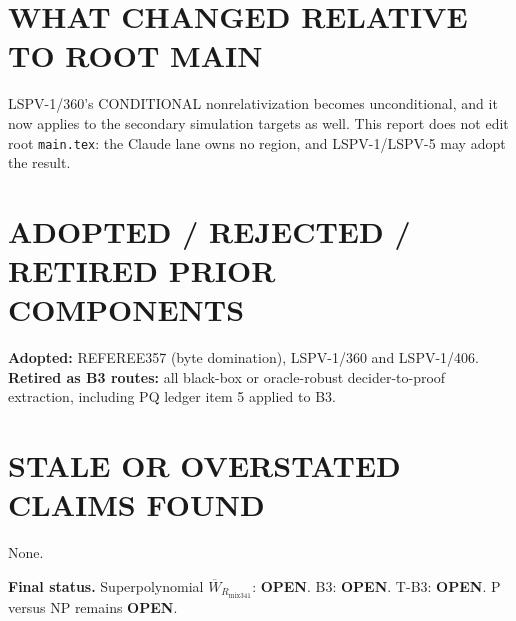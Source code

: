 \documentclass[11pt]{article}
\newcommand{\W}{\overline W}
\begin{document}
\section*{WHAT CHANGED RELATIVE TO ROOT MAIN}
LSPV-1/360's CONDITIONAL nonrelativization becomes unconditional, and it now applies to the secondary simulation targets as well.
This report does not edit root \texttt{main.tex}: the Claude lane owns no region, and LSPV-1/LSPV-5 may adopt the result.

\section*{ADOPTED / REJECTED / RETIRED PRIOR COMPONENTS}
\textbf{Adopted:} REFEREE357 (byte domination), LSPV-1/360 and LSPV-1/406.
\textbf{Retired as B3 routes:} all black-box or oracle-robust decider-to-proof extraction, including PQ ledger item 5 applied to B3.

\section*{STALE OR OVERSTATED CLAIMS FOUND}
None.

\medskip\noindent\textbf{Final status.} Superpolynomial $\W_{R_{\mathrm{mix341}}}$: \textbf{OPEN}. B3: \textbf{OPEN}.
T-B3: \textbf{OPEN}. P versus NP remains \textbf{OPEN}.
\end{document}
